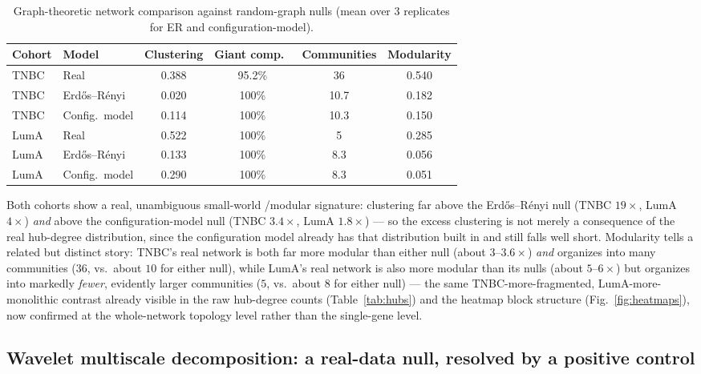 \documentclass[11pt]{article}
\begin{document}
\begin{table}[h]
\centering
\caption{Graph-theoretic network comparison against random-graph nulls
(mean over 3 replicates for ER and configuration-model).}
\label{tab:networktopo}
\begin{tabular}{llcccc}
\toprule
Cohort & Model & Clustering & Giant comp.\ & Communities & Modularity \\
\midrule
TNBC & Real & 0.388 & 95.2\% & 36 & 0.540 \\
TNBC & Erd\H{o}s--R\'enyi & 0.020 & 100\% & 10.7 & 0.182 \\
TNBC & Config.\ model & 0.114 & 100\% & 10.3 & 0.150 \\
\midrule
LumA & Real & 0.522 & 100\% & 5 & 0.285 \\
LumA & Erd\H{o}s--R\'enyi & 0.133 & 100\% & 8.3 & 0.056 \\
LumA & Config.\ model & 0.290 & 100\% & 8.3 & 0.051 \\
\bottomrule
\end{tabular}
\end{table}

Both cohorts show a real, unambiguous small-world \citep{wattsstrogatz1998}/modular signature:
clustering far above the Erd\H{o}s--R\'enyi null (TNBC $19\times$,
LumA $4\times$) \emph{and} above the configuration-model null (TNBC
$3.4\times$, LumA $1.8\times$) --- so the excess clustering is not
merely a consequence of the real hub-degree distribution, since the
configuration model already has that distribution built in and still
falls well short. Modularity tells a related but distinct story: TNBC's
real network is both far more modular than either null (about
$3$--$3.6\times$) \emph{and} organizes into many communities ($36$,
vs.\ about $10$ for either null), while LumA's real network is also
more modular than its nulls (about $5$--$6\times$) but organizes into
markedly \emph{fewer}, evidently larger communities ($5$, vs.\ about
$8$ for either null) --- the same TNBC-more-fragmented,
LumA-more-monolithic contrast already visible in the raw hub-degree
counts (Table~\ref{tab:hubs}) and the heatmap block structure
(Fig.~\ref{fig:heatmaps}), now confirmed at the whole-network topology
level rather than the single-gene level.

\subsection{Wavelet multiscale decomposition: a real-data null, resolved by a positive control}
\label{sec:wavelets}
\end{document}
